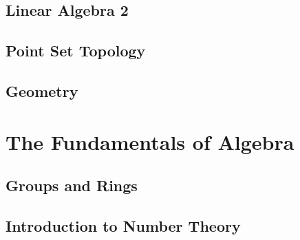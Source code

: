 \documentclass[a4paper]{report}
\begin{document}
\chapter{Linear Algebra 2}


\chapter{Point Set Topology}


\chapter{Geometry}


\part{The Fundamentals of Algebra}
\chapter{Groups and Rings}


\chapter{Introduction to Number Theory}

\end{document}
